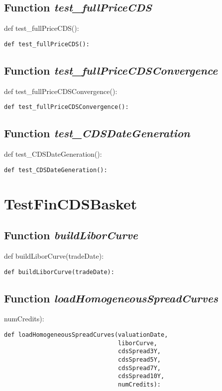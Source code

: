 \documentclass[twoside,11pt]{book}
\begin{document}
\subsection{Function {\it test\_fullPriceCDS}}
def test\_fullPriceCDS():

\begin{lstlisting}
def test_fullPriceCDS():
\end{lstlisting}

\subsection{Function {\it test\_fullPriceCDSConvergence}}
def test\_fullPriceCDSConvergence():

\begin{lstlisting}
def test_fullPriceCDSConvergence():
\end{lstlisting}

\subsection{Function {\it test\_CDSDateGeneration}}
def test\_CDSDateGeneration():

\begin{lstlisting}
def test_CDSDateGeneration():
\end{lstlisting}


\newpage
\section{TestFinCDSBasket}

\subsection{Function {\it buildLiborCurve}}
def buildLiborCurve(tradeDate):

\begin{lstlisting}
def buildLiborCurve(tradeDate):
\end{lstlisting}

\subsection{Function {\it loadHomogeneousSpreadCurves}}
numCredits):

\begin{lstlisting}
def loadHomogeneousSpreadCurves(valuationDate,
                                liborCurve,
                                cdsSpread3Y,
                                cdsSpread5Y,
                                cdsSpread7Y,
                                cdsSpread10Y,
                                numCredits):
\end{lstlisting}
\end{document}
